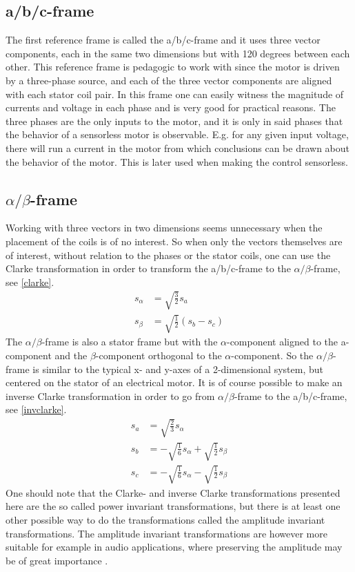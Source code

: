 \documentclass{LTHthesis}
\begin{document}
\subsection{a/b/c-frame}
The first reference frame is called the a/b/c-frame and it uses three vector components, each in the same two dimensions but with 120 degrees between each other. This reference frame is pedagogic to work with since the motor is driven by a three-phase source, and each of the three vector components are aligned with each stator coil pair. In this frame one can easily witness the magnitude of currents and voltage in each phase and is very good for practical reasons. The three phases are the only inputs to the motor, and it is only in said phases that the behavior of a sensorless motor is observable. E.g. for any given input voltage, there will run a current in the motor from which conclusions can be drawn about the behavior of the motor. This is later used when making the control sensorless.
\subsection{$\alpha/\beta$-frame}
Working with three vectors in two dimensions seems unnecessary when the placement of the coils is of no interest. So when only the vectors themselves are of interest, without relation to the phases or the stator coils, one can use the Clarke transformation in order to transform the a/b/c-frame to the $\alpha/\beta$-frame, see \eqref{clarke}.
\begin{subequations} \label{clarke}
\begin{align} 
s_{\alpha}&=\sqrt{\frac{3}{2}}s_{a}\\
s_{\beta}&=\sqrt{\frac{1}{2}}(s_{b}-s_{c})
\end{align}
\end{subequations}
The $\alpha/\beta$-frame is also a stator frame but with the $\alpha$-component aligned to the a-component and the $\beta$-component orthogonal to the $\alpha$-component. So the $\alpha/\beta$-frame is similar to the typical x- and y-axes of a 2-dimensional system, but centered on the stator of an electrical motor. It is of course possible to make an inverse Clarke transformation in order to go from $\alpha/\beta$-frame to the a/b/c-frame, see \eqref{invclarke}.
\begin{subequations} \label{invclarke}
\begin{align}
s_{a}&=\sqrt{\frac{2}{3}}s_{\alpha}\\
s_{b}&=-\sqrt{\frac{1}{6}}s_{\alpha}+\sqrt{\frac{1}{2}}s_{\beta}\\
s_{c}&=-\sqrt{\frac{1}{6}}s_{\alpha}-\sqrt{\frac{1}{2}}s_{\beta}
\end{align}
\end{subequations}
One should note that the Clarke- and inverse Clarke transformations presented here are the so called power invariant transformations, but there is at least one other possible way to do the transformations called the amplitude invariant transformations. The amplitude invariant transformations are however more suitable for example in audio applications, where preserving the amplitude may be of great importance \cite{ala_kar2014}.
\end{document}
